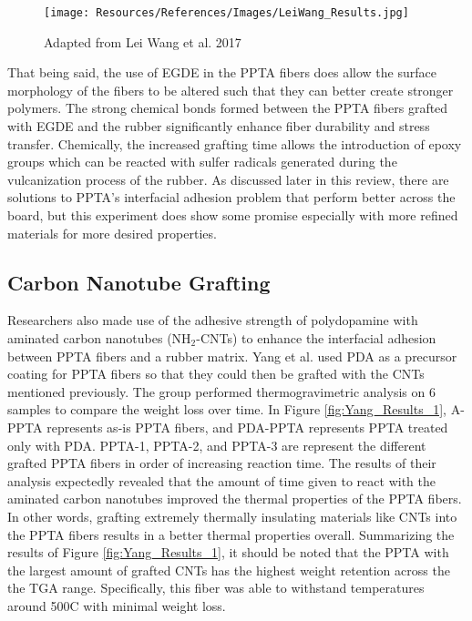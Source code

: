 \documentclass[12pt]{article}
\begin{document}
\begin{multicols}{2}
\begin{figure}[H]
    \centering
    \texttt{[image: Resources/References/Images/LeiWang\_Results.jpg]}
    \caption{\scriptsize{Adapted from Lei Wang et al. 2017 \citep{LeiWang2017}}}
    \label{fig:LeiWang_Results}
\end{figure}

\indent That being said, the use of EGDE in the PPTA fibers does allow the surface morphology of the fibers to be altered such that they can better create stronger polymers. The strong chemical bonds formed between the PPTA fibers grafted with EGDE and the rubber significantly enhance fiber durability and stress transfer. \citep{Kong2018} Chemically, the increased grafting time allows the introduction of epoxy groups which can be reacted with sulfer radicals generated during the vulcanization process of the rubber. \citep{Zhang2012} As discussed later in this review, there are solutions to PPTA's interfacial adhesion problem that perform better across the board, but this experiment does show some promise especially with more refined materials for more desired properties.

\subsection{Carbon Nanotube Grafting}

\indent Researchers also made use of the adhesive strength of polydopamine with aminated carbon nanotubes (NH$_2$-CNTs) to enhance the interfacial adhesion between PPTA fibers and a rubber matrix. Yang et al. \citep{Yang2019} used PDA as a precursor coating for PPTA fibers so that they could then be grafted with the CNTs mentioned previously. The group performed thermogravimetric analysis on 6 samples to compare the weight loss over time. In Figure \ref{fig:Yang_Results_1}, A-PPTA represents as-is PPTA fibers, and PDA-PPTA represents PPTA treated only with PDA. PPTA-1, PPTA-2, and PPTA-3 are represent the different grafted PPTA fibers in order of increasing reaction time. The results of their analysis expectedly revealed that the amount of time given to react with the aminated carbon nanotubes improved the thermal properties of the PPTA fibers. In other words, grafting extremely thermally insulating materials like CNTs into the PPTA fibers results in a better thermal properties overall. Summarizing the results of Figure \ref{fig:Yang_Results_1}, it should be noted that the PPTA with the largest amount of grafted CNTs has the highest weight retention across the the TGA range. Specifically, this fiber was able to withstand temperatures around 500\degree C with minimal weight loss. 


\end{multicols}
\end{document}
